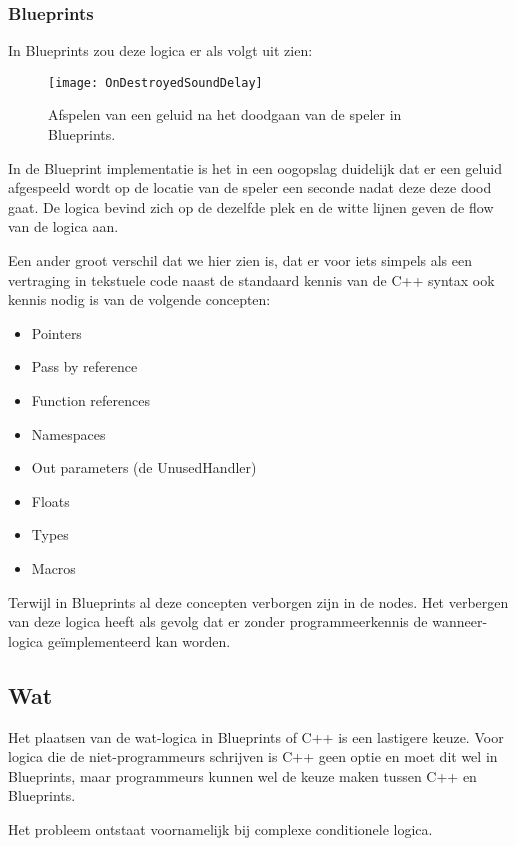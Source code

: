 \subsubsection{Blueprints}
In Blueprints zou deze logica er als volgt uit zien:

\begin{figure}[!ht]
  \centering
    \texttt{[image: OnDestroyedSoundDelay]}
    \caption{Afspelen van een geluid na het doodgaan van de speler in Blueprints.}
\end{figure}

In de Blueprint implementatie is het in een oogopslag duidelijk dat er een geluid afgespeeld wordt op de locatie van de speler een seconde nadat deze deze dood gaat. De logica bevind zich op de dezelfde plek en de witte lijnen geven de flow van de logica aan. 

Een ander groot verschil dat we hier zien is, dat er voor iets simpels als een vertraging in tekstuele code naast de standaard kennis van de C++ syntax ook kennis nodig is van de volgende concepten:

\begin{itemize}
	\item Pointers
	\item Pass by reference
	\item Function references
	\item Namespaces
	\item Out parameters (de UnusedHandler)
	\item Floats
	\item Types
	\item Macros 
\end{itemize}

Terwijl in Blueprints al deze concepten verborgen zijn in de nodes. Het verbergen van deze logica heeft als gevolg dat er zonder programmeerkennis de wanneer-logica geïmplementeerd kan worden.

\subsection{Wat}

Het plaatsen van de wat-logica in Blueprints of C++ is een lastigere keuze. Voor logica die de niet-programmeurs schrijven is C++ geen optie en moet dit wel in Blueprints, maar programmeurs kunnen wel de keuze maken tussen C++ en Blueprints.

Het probleem ontstaat voornamelijk bij complexe conditionele logica.

